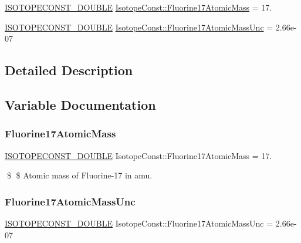 \begin{DoxyCompactItemize}
\item 
\mbox{\hyperlink{group___isotope_const-_macros_ga8f45a7272ce02c0b4c65c44636ed719a}{I\+S\+O\+T\+O\+P\+E\+C\+O\+N\+S\+T\+\_\+\+D\+O\+U\+B\+LE}} \mbox{\hyperlink{group___isotope_const-_fluorine-_f17_ga758438ffb7aa2ebaf3d578e56b495427}{Isotope\+Const\+::\+Fluorine17\+Atomic\+Mass}} = 17.
\item 
\mbox{\hyperlink{group___isotope_const-_macros_ga8f45a7272ce02c0b4c65c44636ed719a}{I\+S\+O\+T\+O\+P\+E\+C\+O\+N\+S\+T\+\_\+\+D\+O\+U\+B\+LE}} \mbox{\hyperlink{group___isotope_const-_fluorine-_f17_ga7aff7673402230e7214dcc0725610a15}{Isotope\+Const\+::\+Fluorine17\+Atomic\+Mass\+Unc}} = 2.\+66e-\/07
\end{DoxyCompactItemize}


\subsection{Detailed Description}


\subsection{Variable Documentation}
\mbox{\label{group___isotope_const-_fluorine-_f17_ga758438ffb7aa2ebaf3d578e56b495427}} 
\subsubsection{\texorpdfstring{Fluorine17\+Atomic\+Mass}{Fluorine17AtomicMass}}
{\footnotesize\ttfamily \mbox{\hyperlink{group___isotope_const-_macros_ga8f45a7272ce02c0b4c65c44636ed719a}{I\+S\+O\+T\+O\+P\+E\+C\+O\+N\+S\+T\+\_\+\+D\+O\+U\+B\+LE}} Isotope\+Const\+::\+Fluorine17\+Atomic\+Mass = 17.}

\$ \$ Atomic mass of Fluorine-\/17 in amu. \mbox{\label{group___isotope_const-_fluorine-_f17_ga7aff7673402230e7214dcc0725610a15}} 
\subsubsection{\texorpdfstring{Fluorine17\+Atomic\+Mass\+Unc}{Fluorine17AtomicMassUnc}}
{\footnotesize\ttfamily \mbox{\hyperlink{group___isotope_const-_macros_ga8f45a7272ce02c0b4c65c44636ed719a}{I\+S\+O\+T\+O\+P\+E\+C\+O\+N\+S\+T\+\_\+\+D\+O\+U\+B\+LE}} Isotope\+Const\+::\+Fluorine17\+Atomic\+Mass\+Unc = 2.\+66e-\/07}

